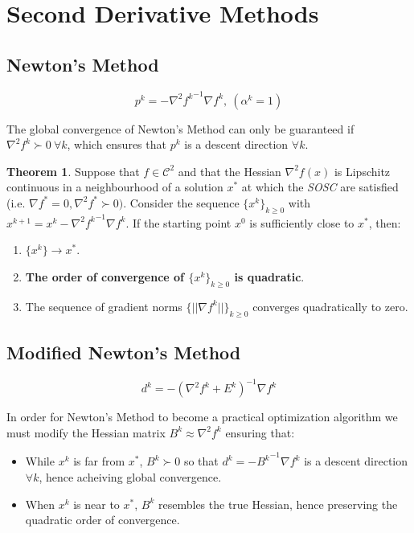\documentclass[a4paper, 10pt, twocolumn]{article}
\theoremstyle{definition}
\newtheorem{theorem}{Theorem}
\theoremstyle{remark}
\newcommand{\al}{\alpha}
\newcommand{\C}{\mathcal{C}}
\begin{document}
\newpage



\section{Second Derivative Methods}


\subsection{Newton's Method}

$$
\boxed{p^k = - {\nabla^2f^k}^{-1}\nabla f^k, \ (\al^k = 1)}
$$

The global convergence of Newton's Method can only be guaranteed if $\nabla^2f^k \succ 0 \  \forall k$, which ensures that $p^k$ is a descent direction $\forall k$.

\begin{theorem}
Suppose that $f \in \C^2$ and that the Hessian $\nabla^2f(x)$ is Lipschitz continuous in a neighbourhood of a solution $x^*$ at which the \textit{SOSC} are satisfied (i.e. $\nabla f^* = 0, \nabla^2f^* \succ 0)$. Consider the sequence $\{x^k\}_{k\geq 0}$ with $x^{k+1} = x^k -{\nabla^2f^k}^{-1}\nabla f^k$. If the starting point $x^0$ is sufficiently close to $x^*$, then:

\begin{enumerate}[label=\roman*.]
\item $\{x^k\} \rightarrow x^*$.
\item \textbf{The order of convergence of $\{x^k\}_{k\geq 0}$ is quadratic}.
\item The sequence of gradient norms $\{ ||\nabla f^k|| \}_{k\geq 0}$ converges quadratically to zero.
\end{enumerate}

\end{theorem}


\subsection{Modified Newton's Method}

$$
\boxed{d^k = -(\nabla^2f^k + E^k)^{-1}\nabla f^k }
$$

In order for Newton's Method to become a practical optimization algorithm we must modify the Hessian matrix $B^k \approx \nabla^2f^k$ ensuring that:

\begin{itemize}
\item While $x^k$ is far from $x^*$, $B^k \succ 0$ so that $d^k = - {B^k}^{-1}\nabla f^k$ is a descent direction $\forall k$, hence acheiving global convergence.
\item When $x^k$ is near to $x^*$, $B^k$ resembles the true Hessian, hence preserving the quadratic order of convergence.
\end{itemize}
\end{document}
